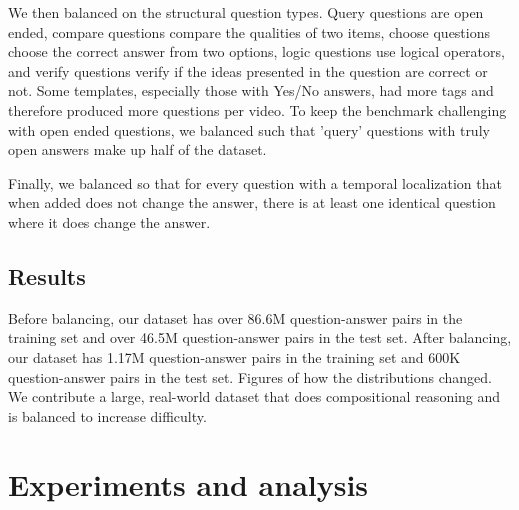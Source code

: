\documentclass[10pt,twocolumn,letterpaper]{article}
\newcommand{\mgm}[1]{{\color{cyan}{mgm: #1}}}
\begin{document}
We then balanced on the structural question types. Query questions are open ended, compare questions compare the qualities of two items, choose questions choose the correct answer from two options, logic questions use logical operators, and verify questions verify if the ideas presented in the question are correct or not. Some templates, especially those with Yes/No answers, had more tags and therefore produced more questions per video. To keep the benchmark challenging with open ended questions, we balanced such that 'query' questions with truly open answers make up half of the dataset.  \mgm{Have a table with the structure, a description, \% before balancing and \% after balancing. Figure for the distribution before and after.}

Finally, we balanced so that for every question with a temporal localization that when added does not change the answer, there is at least one identical question where it does change the answer.

\subsection{Results}
Before balancing, our dataset has over 86.6M question-answer pairs in the training set and over 46.5M question-answer pairs in the test set. After balancing, our dataset has 1.17M question-answer pairs in the training set and 600K question-answer pairs in the test set. Figures of how the distributions changed. We contribute a large, real-world dataset that does compositional reasoning and is balanced to increase difficulty. 



\section{Experiments and analysis}

\end{document}
